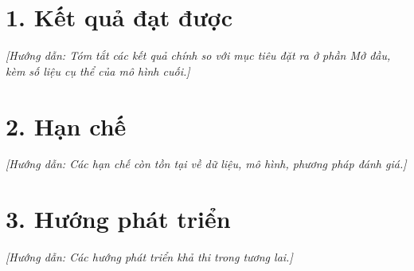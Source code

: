 \documentclass[12pt,a4paper,oneside]{report}
\newcommand{\huongdan}[1]{{\color{guide}\itshape [Hướng dẫn: #1]}}
\begin{document}
\section*{1. Kết quả đạt được}
\huongdan{Tóm tắt các kết quả chính so với mục tiêu đặt ra ở phần Mở đầu,
kèm số liệu cụ thể của mô hình cuối.}

\section*{2. Hạn chế}
\huongdan{Các hạn chế còn tồn tại về dữ liệu, mô hình, phương pháp đánh giá.}

\section*{3. Hướng phát triển}
\huongdan{Các hướng phát triển khả thi trong tương lai.}
\end{document}
